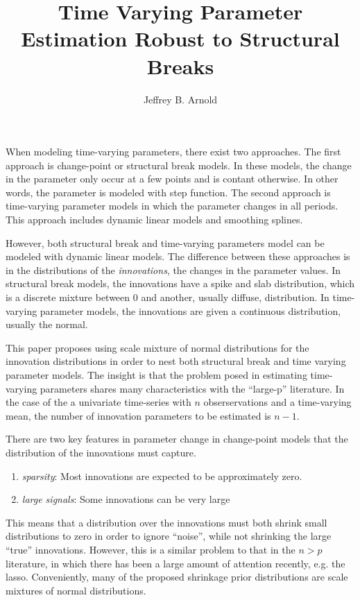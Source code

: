 \documentclass{article}
\author{Jeffrey B. Arnold}
\title{Time Varying Parameter Estimation Robust to Structural Breaks}
\begin{document}
\maketitle{}

When modeling time-varying parameters, there exist two approaches. 
The first approach is change-point or structural break models. 
In these models, the change in the parameter only occur at a few points and is contant otherwise.
In other words, the parameter is modeled with step function.
The second approach is time-varying parameter models in which the parameter changes in all periods.
This approach includes dynamic linear models and smoothing splines.

However, both structural break and time-varying parameters model can be modeled with dynamic linear models.
The difference between these approaches is in the distributions of the \textit{innovations}, the changes in the parameter values.
In structural break models, the innovations have a spike and slab distribution, which is a discrete mixture between 0 and another, usually diffuse, distribution.
In time-varying parameter models, the innovations are given a continuous distribution, usually the normal.

This paper proposes using scale mixture of normal distributions for the innovation distributions in order to nest both structural break and time varying parameter models.
The insight is that the problem posed in estimating time-varying parameters shares many characteristics with the ``large-p'' literature.
In the case of the a univariate time-series with $n$ obserservations and a time-varying mean, the number of innovation parameters to be estimated is $n - 1$.


There are two key features in parameter change in change-point models that the distribution of the innovations must capture.
\begin{enumerate}
\item \textit{sparsity}: Most innovations are expected to be approximately zero.
\item \textit{large signals}: Some innovations can be very large
\end{enumerate}
This means that a distribution over the innovations must both shrink small distributions to zero in order to ignore ``noise'', while not shrinking the large ``true'' innovations.
However, this is a similar problem to that in the $n > p$ literature, in which there has been a large amount of attention recently, e.g. the lasso.
Conveniently, many of the proposed shrinkage prior distributions are scale mixtures of normal distributions.
\end{document}

